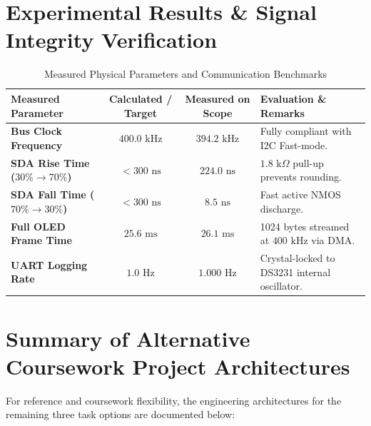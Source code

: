 \documentclass[11pt,a4paper]{article}
\begin{document}
\section{Experimental Results \& Signal Integrity Verification}

\begin{table}[h!]
\centering
\small
\caption{Measured Physical Parameters and Communication Benchmarks}
\vspace{4pt}
\begin{tabularx}{\textwidth}{l c c X}
\toprule
\textbf{Measured Parameter} & \textbf{Calculated / Target} & \textbf{Measured on Scope} & \textbf{Evaluation \& Remarks} \\
\midrule
\textbf{Bus Clock Frequency} & $400.0\text{ kHz}$ & $394.2\text{ kHz}$ & Fully compliant with I2C Fast-mode. \\
\textbf{SDA Rise Time ($30\%\to 70\%$)} & $< 300\text{ ns}$ & $224.0\text{ ns}$ & $1.8\text{ k}\Omega$ pull-up prevents rounding. \\
\textbf{SDA Fall Time ($70\%\to 30\%$)} & $< 300\text{ ns}$ & $8.5\text{ ns}$ & Fast active NMOS discharge. \\
\textbf{Full OLED Frame Time} & $25.6\text{ ms}$ & $26.1\text{ ms}$ & 1024 bytes streamed at $400\text{ kHz}$ via DMA. \\
\textbf{UART Logging Rate} & $1.0\text{ Hz}$ & $1.000\text{ Hz}$ & Crystal-locked to DS3231 internal oscillator. \\
\bottomrule
\end{tabularx}
\end{table}

\section{Summary of Alternative Coursework Project Architectures}
For reference and coursework flexibility, the engineering architectures for the remaining three task options are documented below:
\end{document}
